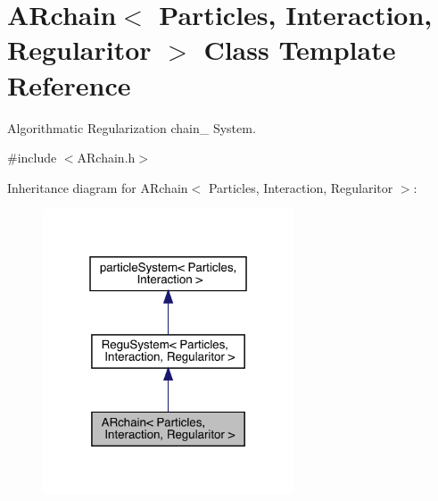 \hypertarget{class_a_rchain}{}\section{A\+Rchain$<$ Particles, Interaction, Regularitor $>$ Class Template Reference}
\label{class_a_rchain}


Algorithmatic Regularization chain_ System.




{\ttfamily \#include $<$A\+Rchain.\+h$>$}



Inheritance diagram for A\+Rchain$<$ Particles, Interaction, Regularitor $>$\+:\nopagebreak
\begin{figure}[H]
\begin{center}
\leavevmode
\includegraphics[width=211pt]{class_a_rchain__inherit__graph}
\end{center}
\end{figure}


